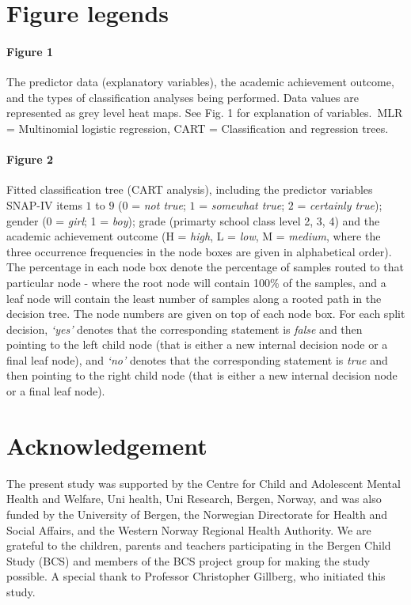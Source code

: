 \documentclass[10pt,letterpaper]{article}
\begin{document}
{{\vspace{5mm}
\section*{Figure legends}
\paragraph{Figure 1} The predictor data (explanatory variables), the academic achievement outcome, and the types of classification analyses being performed. 
Data values are represented as grey level heat maps. See 
Fig. 1 for explanation of variables.\,
MLR = Multinomial logistic regression, CART = Classification and regression trees. \\



\vspace{5mm}

\paragraph{Figure 2} Fitted classification tree (CART analysis),  including the predictor variables SNAP-IV items $1$ to $9$ ($0$ = \emph{not true}; $1$ = \emph{somewhat true};
 $2$ = \emph{certainly true}); gender (0 = \emph{girl}; 1 = \emph{boy}); grade (primarty school class level 2, 3, 4) and the academic achievement outcome (H = \emph{high}, L = \emph{low},  M = \emph{medium}, where the three occurrence frequencies in the node boxes are given in alphabetical order). The percentage in each node box denote the
 percentage of samples routed to that particular node - where the root node will contain 100\% of the samples, and a leaf node will contain the least number of samples along 
 a rooted path in the decision tree.
The node numbers are given on top of each node box. For each split decision, \emph{`yes'} denotes that the corresponding statement is \emph{ false} 
and then pointing to the left child node
(that is either a new internal decision node or a final leaf node), and \emph{`no'}
denotes that the corresponding statement is \emph{true} and then pointing to the right child node (that is either a new internal decision node or a final leaf node).  



\section*{Acknowledgement}
The present study was supported by the Centre for Child and Adolescent Mental Health and Welfare, Uni health, Uni
Research, Bergen, Norway, and was also funded by the University of Bergen, the Norwegian Directorate for Health and
Social Affairs, and the Western Norway Regional Health Authority. We are grateful to the children, parents and teachers
participating in the Bergen Child Study (BCS) and members of the BCS project group for making the study possible. A
special thank to Professor Christopher Gillberg, who initiated this study.

}}
\end{document}
